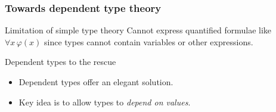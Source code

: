 \documentclass{beamer}
\begin{document}
\begin{frame}
  \frametitle{Towards dependent type theory} 
  \begin{block} {Limitation of simple type theory}
    Cannot express quantified formulae like $\forall x \, \varphi(x)$ since
    types cannot contain variables or other expressions.
  \end{block}

  \begin{block} {Dependent types to the rescue}
    \begin{itemize} [label=$\ast$]
      \item Dependent types offer an elegant solution. 
      \item Key idea is to allow types to \textit{depend on values}.
    \end{itemize}

  \end{block}

\end{frame}
\end{document}

